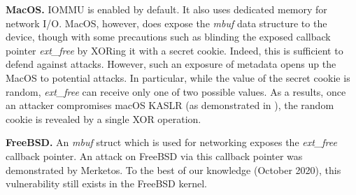 \smallskip
\noindent\textbf{MacOS.} IOMMU is enabled by default. It also uses dedicated memory for network I/O. MacOS, however, does expose the \textit{mbuf} data structure to the device, though with some precautions such as blinding the exposed callback pointer \textit{ext\_free} by XORing it with a secret cookie.
Indeed, this is sufficient to defend against \simple attacks. However, such an exposure of metadata opens up the MacOS to potential \compound attacks.
In particular, while the value of the secret cookie is random, \textit{ext\_free} can receive only one of two possible values. As a results, once an attacker compromises macOS KASLR (as demonstrated in \cite{thunder}), the random cookie is revealed by a single XOR operation.  

\smallskip
\noindent\textbf{FreeBSD.} An \textit{mbuf} struct which is used for networking exposes the \textit{ext\_free} callback pointer. An attack on FreeBSD via this callback pointer was  demonstrated by Merketos\cite{thunder}. To the best of our knowledge (October 2020), this vulnerability still exists in the FreeBSD kernel. 

